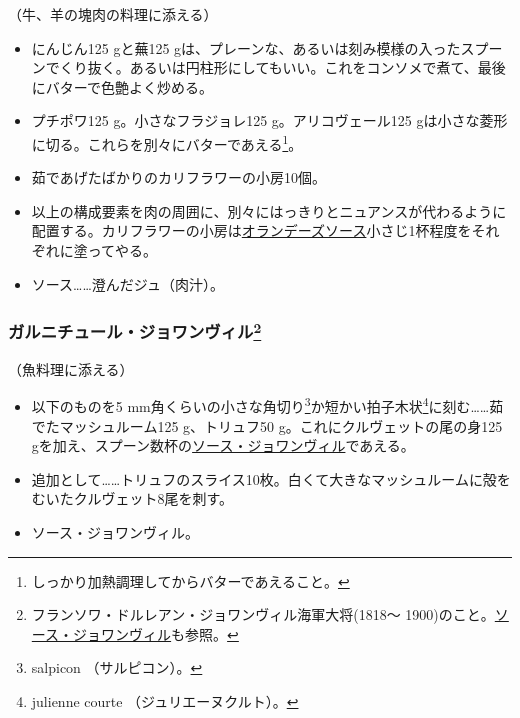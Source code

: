 \begin{recette}


（牛、羊の塊肉の料理に添える）

\begin{itemize}
\item
  にんじん125 gと蕪125
  gは、プレーンな、あるいは刻み模様の入ったスプーンでくり抜く。あるいは円柱形にしてもいい。これをコンソメで煮て、最後にバターで色艶よく炒める。
\item
  プチポワ125 g。小さなフラジョレ125 g。アリコヴェール125
  gは小さな菱形に切る。これらを別々にバターであえる\footnote{しっかり加熱調理してからバターであえること。}。
\item
  茹であげたばかりのカリフラワーの小房10個。
\item
  以上の構成要素を肉の周囲に、別々にはっきりとニュアンスが代わるように配置する。カリフラワーの小房は\protect\hyperlink{sauce-hollandaise}{オランデーズソース}小さじ1杯程度をそれぞれに塗ってやる。
\item
  ソース\ldots{}\ldots{}澄んだジュ（肉汁）。
\end{itemize}

\hypertarget{garniture-joinville}{%
\subsubsection[ガルニチュール・ジョワンヴィル]{\texorpdfstring{ガルニチュール・ジョワンヴィル\footnote{フランソワ・ドルレアン・ジョワンヴィル海軍大将(1818〜
  1900)のこと。\protect\hyperlink{sauce-joinville}{ソース・ジョワンヴィル}も参照。}}{ガルニチュール・ジョワンヴィル}}\label{garniture-joinville}}



（魚料理に添える）

\begin{itemize}
\item
  以下のものを5 mm角くらいの小さな角切り\footnote{salpicon
    （サルピコン）。}か短かい拍子木状\footnote{julienne courte
    （ジュリエーヌクルト）。}に刻む\ldots{}\ldots{}茹でたマッシュルーム125
  g、トリュフ50 g。これにクルヴェットの尾の身125
  gを加え、スプーン数杯の\protect\hyperlink{sauce-joinville}{ソース・ジョワンヴィル}であえる。
\item
  追加として\ldots{}\ldots{}トリュフのスライス10枚。白くて大きなマッシュルームに殻をむいたクルヴェット8尾を刺す。
\item
  ソース・ジョワンヴィル。
\end{itemize}


\end{recette}
